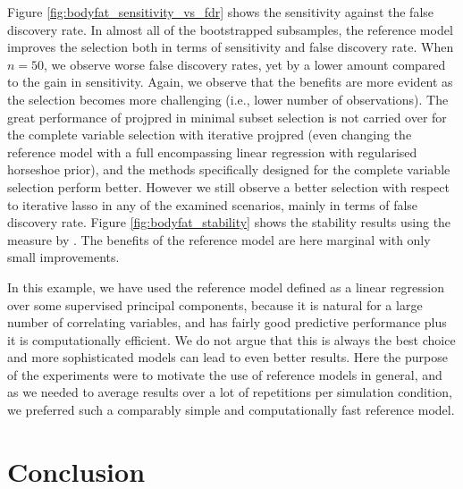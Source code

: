\documentclass[a4]{article}
\theoremstyle{definition}
\begin{document}
Figure \ref{fig:bodyfat_sensitivity_vs_fdr} shows the sensitivity
against the false discovery rate.  In almost all of the bootstrapped
subsamples, the reference
model improves the selection both in terms of sensitivity and false
discovery rate. When $n=50$, we observe worse false
discovery rates, yet by a lower amount compared to the gain in
sensitivity. Again, we observe that the benefits are more evident as
the selection becomes more challenging (i.e., lower number of
observations).
The great performance of projpred in minimal subset selection is not
carried over for the complete variable selection with iterative
projpred (even changing the reference model with a full encompassing 
linear regression with regularised horseshoe prior), and the methods 
specifically designed for the complete variable selection perform better. 
However we still observe a better selection with respect to iterative lasso
in any of the examined scenarios, mainly in terms of false discovery rate.
Figure \ref{fig:bodyfat_stability} shows the stability
results using the measure by
\cite{paper:stability}. The benefits of the reference model are here
marginal with only small improvements.

In this example, we have used the reference model defined as a linear
regression over some supervised principal components, because it is
natural for a large number of correlating variables, and has fairly good
predictive performance plus it is computationally efficient. We do not
argue that this is always the best choice and more sophisticated
models can lead to even better results. Here the purpose of the
experiments were to motivate the use of reference models in general,
and as we needed to average results over a lot of repetitions per
simulation condition, we preferred such a comparably simple and
computationally fast reference model.

\hypertarget{conclusion}{%
\section{Conclusion}\label{conclusion}}
\end{document}
